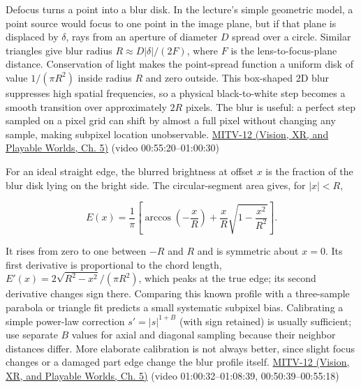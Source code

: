 Defocus turns a point into a blur disk. In the lecture's simple geometric model, a point source would focus to one point in the image plane, but if that plane is displaced by \(\delta\), rays from an aperture of diameter \(D\) spread over a circle. Similar triangles give blur radius \(R\approx D|\delta|/(2F)\), where \(F\) is the lens-to-focus-plane distance. Conservation of light makes the point-spread function a uniform disk of value \(1/(\pi R^2)\) inside radius \(R\) and zero outside. This box-shaped 2D blur suppresses high spatial frequencies, so a physical black-to-white step becomes a smooth transition over approximately \(2R\) pixels. The blur is useful: a perfect step sampled on a pixel grid can shift by almost a full pixel without changing any sample, making subpixel location unobservable. \href{../07-Vision-XR-and-Playable-Worlds/main.pdf\#nameddest=04-visual-computing-ii-ch036-mitv-12---blob-analysis-binary-image-processing-greens-theorem-derivative-and-integral}{MITV-12 (Vision, XR, and Playable Worlds, Ch. 5)} (video 00:55:20--01:00:30)

For an ideal straight edge, the blurred brightness at offset \(x\) is the fraction of the blur disk lying on the bright side. The circular-segment area gives, for \(|x|<R\),

\[
E(x)=\frac{1}{\pi}\left[\arccos\left(-\frac{x}{R}\right)+\frac{x}{R}\sqrt{1-\frac{x^2}{R^2}}\right].
\]

It rises from zero to one between \(-R\) and \(R\) and is symmetric about \(x=0\). Its first derivative is proportional to the chord length, \(E'(x)=2\sqrt{R^2-x^2}/(\pi R^2)\), which peaks at the true edge; its second derivative changes sign there. Comparing this known profile with a three-sample parabola or triangle fit predicts a small systematic subpixel bias. Calibrating a simple power-law correction \(s'=|s|^{1+B}\) (with sign retained) is usually sufficient; use separate \(B\) values for axial and diagonal sampling because their neighbor distances differ. More elaborate calibration is not always better, since slight focus changes or a damaged part edge change the blur profile itself. \href{../07-Vision-XR-and-Playable-Worlds/main.pdf\#nameddest=04-visual-computing-ii-ch036-mitv-12---blob-analysis-binary-image-processing-greens-theorem-derivative-and-integral}{MITV-12 (Vision, XR, and Playable Worlds, Ch. 5)} (video 01:00:32--01:08:39, 00:50:39--00:55:18)

